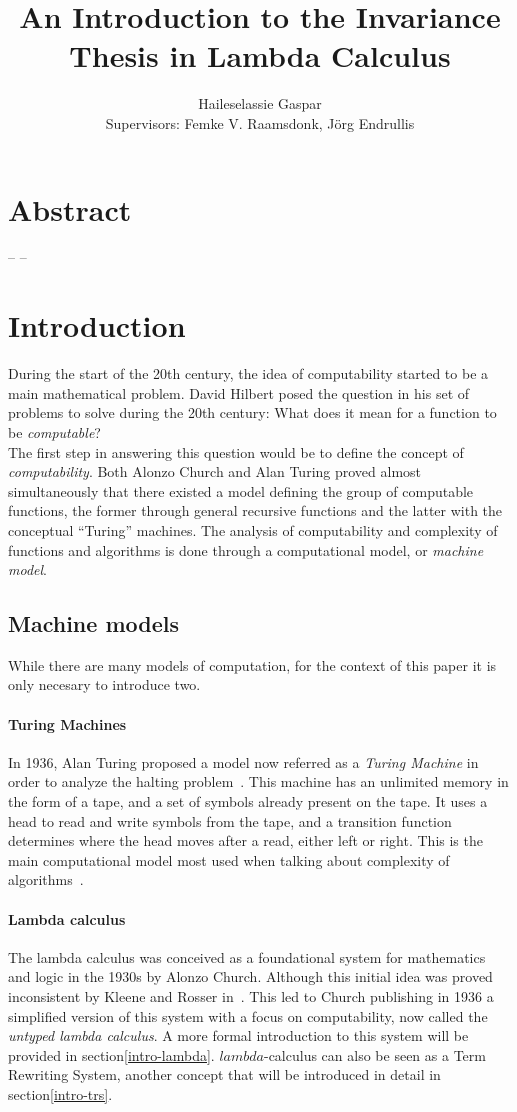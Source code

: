 \documentclass[12pt]{article}
\title{An Introduction to the Invariance Thesis in Lambda Calculus}
\author{Haileselassie Gaspar\\[1cm]{\small Supervisors: Femke V. Raamsdonk, Jörg Endrullis}}
\begin{document}
\maketitle

\section{Abstract}\label{abstract}
-- --
\section{Introduction}
During the start of the 20th century, the idea of computability started to be a main mathematical problem. David Hilbert posed the question in his set of problems to solve during the 20th century: What does it mean for a function to be \textit{computable}? \\
The first step in answering this question would be to define the concept of \textit{computability}. Both Alonzo Church and Alan Turing proved almost simultaneously that there existed a model defining the group of computable functions, the former through general recursive functions and the latter with the conceptual \enquote{Turing} machines.
The analysis of computability and complexity of functions and algorithms is done through a computational model, or \textit{machine model}.
\subsection{Machine models}
While there are many models of computation, for the context of this paper it is only necesary to introduce two.

\paragraph{Turing Machines}
In 1936, Alan Turing proposed a model now referred as a \textit{Turing Machine} in order to analyze the halting problem~\cite{on-computable-numbers}. This machine has an unlimited memory in the form of a tape, and a set of symbols already present on the tape. It uses a head to read and write symbols from the tape, and a transition function determines where the head moves after a read, either left or right. This is the main computational model most used when talking about complexity of algorithms~\cite{computation-theory}.

\paragraph{Lambda calculus}
The lambda calculus was conceived as a foundational system for mathematics and logic in the 1930s by Alonzo Church. Although this initial idea was proved inconsistent by Kleene and Rosser in~\cite{rosser-kleene-inconsistency}. This led to Church publishing in 1936 a simplified version of this system with a focus on computability, now called the \textit{untyped lambda calculus}. A more formal introduction to this system will be provided in section\ref{intro-lambda}. $lambda$-calculus can also be seen as a Term Rewriting System, another concept that will be introduced in detail in section\ref{intro-trs}.
\end{document}
